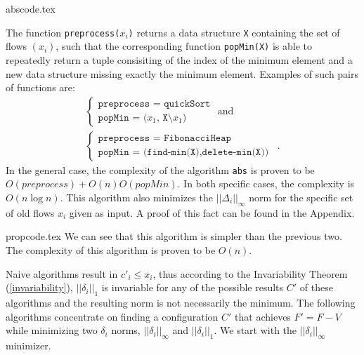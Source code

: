   {abscode.tex}

  The function \texttt{preprocess(}$x_i$\texttt{)} returns a data structure \texttt{X} containing the set of flows
  $\left(x_i\right)$, such that the corresponding function \texttt{popMin(X)} is able to repeatedly return a tuple
  consisiting of the index of the minimum element and a new data structure missing exactly the minimum element.
  Examples of such pairs of functions are:
  \begin{equation*}
  \begin{gathered}
    \begin{cases}
      \texttt{preprocess = quickSort} \\
      \texttt{popMin = (}x_1\texttt{, X}\setminus x_1\texttt{)}
    \end{cases}
    \mbox{ and} \\
    \begin{cases}
      \texttt{preprocess = FibonacciHeap} \\
      \texttt{popMin = (find-min(X),delete-min(X))}
    \end{cases} \enspace.
  \end{gathered}
  \end{equation*}
  In the general case, the complexity of the algorithm \texttt{abs} is proven to be
  $O\left(preprocess\right) + O\left(n\right)O\left(popMin\right)$. In both specific cases, the complexity is
  $O\left(n\log{n}\right)$. This algorithm also minimizes the $||\Delta_i||_\infty$ norm for the specific set of old flows
  $x_i$ given as input. A proof of this fact can be found in the Appendix.

  {propcode.tex}
  We can see that this algorithm is simpler than the previous two. The complexity of this algorithm is proven to be
  $O\left(n\right)$.

  Naive algorithms result in $c'_i \leq x_i$, thus according to the Invariability Theorem (\ref{invariability}),
  $||\delta_i||_1$ is invariable for any of the possible results $C'$ of these algorithms and the resulting norm is not
  necessarily the minimum. The following algorithms concentrate on finding a configuration $C'$ that achieves $F' = F - V$
  while minimizing two $\delta_i$ norms, $||\delta_i||_\infty$ and $||\delta_i||_1$. We start with the
  $||\delta_i||_\infty$ minimizer.

